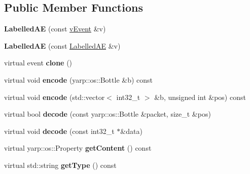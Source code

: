 \subsection*{Public Member Functions}
\begin{DoxyCompactItemize}
\item 
\mbox{\label{classev_1_1LabelledAE_ad9d765e87dbd81bddf3b58b7ba0f1b8a}} 
{\bfseries Labelled\+AE} (const \hyperlink{classev_1_1vEvent}{v\+Event} \&v)
\item 
\mbox{\label{classev_1_1LabelledAE_aeca0ead752908e7c7f22aeb69b4f7e3a}} 
{\bfseries Labelled\+AE} (const \hyperlink{classev_1_1LabelledAE}{Labelled\+AE} \&v)
\item 
\mbox{\label{classev_1_1LabelledAE_aad6de4f38547d2b586c333de1c247ccf}} 
virtual event {\bfseries clone} ()
\item 
\mbox{\label{classev_1_1LabelledAE_a94139f3efa3348321c1abe7d83ecbec1}} 
virtual void {\bfseries encode} (yarp\+::os\+::\+Bottle \&b) const
\item 
\mbox{\label{classev_1_1LabelledAE_aaf4853cdd0109920cd5390c6fb003d9d}} 
virtual void {\bfseries encode} (std\+::vector$<$ int32\+\_\+t $>$ \&b, unsigned int \&pos) const
\item 
\mbox{\label{classev_1_1LabelledAE_a6eb8dc1ac3a95d4fef78185d39f3fb94}} 
virtual bool {\bfseries decode} (const yarp\+::os\+::\+Bottle \&packet, size\+\_\+t \&pos)
\item 
\mbox{\label{classev_1_1LabelledAE_ab29b196e5174f6de031f8dcba3810027}} 
virtual void {\bfseries decode} (const int32\+\_\+t $\ast$\&data)
\item 
\mbox{\label{classev_1_1LabelledAE_a4e802e80cc0d6171372352dcad220dbd}} 
virtual yarp\+::os\+::\+Property {\bfseries get\+Content} () const
\item 
\mbox{\label{classev_1_1LabelledAE_afd87d52a4b0f54994713be9c99b5b139}} 
virtual std\+::string {\bfseries get\+Type} () const
\end{DoxyCompactItemize}
